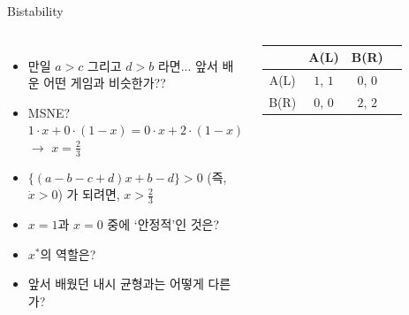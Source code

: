 \documentclass[final]{beamer}
\begin{document}
\begin{frame}[t]{Bistability}
	\begin{columns}[c]
		\column{17em}
		\small
		\begin{itemize}
		\item 만일 $a>c$ 그리고 $d>b$ 라면... 앞서 배운 어떤 게임과 비슷한가??
		\item MSNE? $1 \cdot x + 0 \cdot (1-x) = 0 \cdot x + 2 \cdot (1 - x)$ $\rightarrow$ $x = \frac{2}{3}$
		\item $\{(a-b-c+d)x + b-d \} > 0$ (즉, $\dot{x} > 0$) 가 되려면, $x > \frac{2}{3}$
		\item $x=1$과 $x=0$ 중에 `안정적'인 것은?
		\item $x^*$의 역할은? 
		\item 앞서 배웠던 내시 균형과는 어떻게 다른가? 
		\end{itemize}
		\column{14em}
		\hspace{-1em}
		\begin{table}
		\setlength{\tabcolsep}{1.2em}
		\begin{tabular}{|c|c|c|c|} \hline
		& {A(L)} &  {B(R)}\\ \hline
		{A(L)} & {$1$}, {$1$} & {$0$}, {$0$} \\ \hline%
		{B(R)} & {$0$}, {$0$}  & {$2$}, {$2$}\\ 
		\hline
		\end{tabular}
		\end{table}
	\end{columns}
\end{frame}
\end{document}
